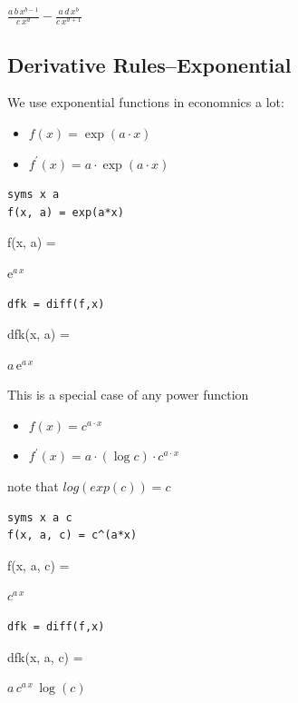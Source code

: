 \documentclass[
]{book}
\begin{document}
\(\displaystyle \frac{a\,b\,x^{b-1} }{c\,x^d }-\frac{a\,d\,x^b }{c\,x^{d+1} }\)

\hypertarget{derivative-rulesexponential}{%
\subsection{Derivative Rules--Exponential}\label{derivative-rulesexponential}}

We use exponential functions in economnics a lot:

\begin{itemize}
\item
  \(\displaystyle f(x)=\exp (a\cdot x)\)
\item
  \(\displaystyle f^{\prime } (x)=a\cdot \exp (a\cdot x)\)
\end{itemize}

\begin{verbatim}
syms x a
f(x, a) = exp(a*x)
\end{verbatim}

f(x, a) =

\(\displaystyle {\mathrm{e}}^{a\,x}\)

\begin{verbatim}
dfk = diff(f,x)
\end{verbatim}

dfk(x, a) =

\(\displaystyle a\,{\mathrm{e}}^{a\,x}\)

This is a special case of any power function

\begin{itemize}
\item
  \(\displaystyle f(x)=c^{a\cdot x}\)
\item
  \(\displaystyle f^{\prime } (x)=a\cdot (\log c)\cdot c^{a\cdot x}\)
\end{itemize}

note that \(log(exp(c))=c\)

\begin{verbatim}
syms x a c
f(x, a, c) = c^(a*x)
\end{verbatim}

f(x, a, c) =

\(\displaystyle c^{a\,x}\)

\begin{verbatim}
dfk = diff(f,x)
\end{verbatim}

dfk(x, a, c) =

\(\displaystyle a\,c^{a\,x} \,\log \left(c\right)\)
\end{document}
